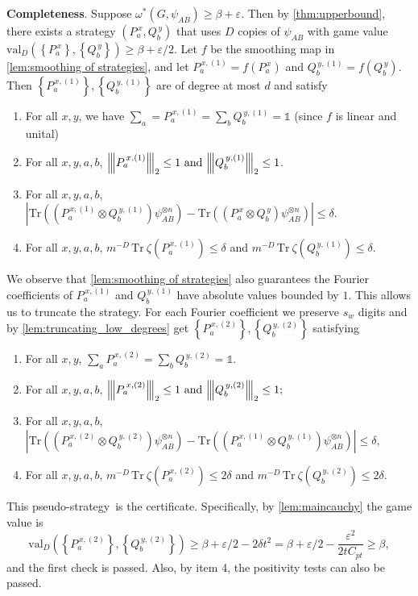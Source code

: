 \documentclass[10pt,a4paper]{article}
\theoremstyle{plain}
\theoremstyle{definition}
\newcommand {\set} [1] {\ensuremath{ \left\lbrace #1 \right\rbrace }}
\newcommand {\br} [1] {\ensuremath{ \left( #1 \right) }}
\newcommand {\ab} [1] {\ensuremath{ \left| #1 \right| }}
\newcommand{\nnorm}[1]{{\left\vert\kern-0.25ex\left\vert\kern-0.25ex\left\vert #1
		\right\vert\kern-0.25ex\right\vert\kern-0.25ex\right\vert}}
\newcommand {\Tr} {\ensuremath{ \mathrm{Tr} }}
\newcommand {\id} {\ensuremath{\mathds{1}}}
\newcommand{\gval}[3]{\ensuremath{\mathrm{val}_{#1}\br{\set{#2},\set{#3}}}}
\newcommand{\ep} {\ensuremath{\varepsilon}}
\newcommand{\dmcc} {\ensuremath{C_{pt}}}
\newcommand{\dlbo} {\ensuremath{{D}}}
\newcommand{\dldd} {\ensuremath{{d}}}
\newcommand{\wireal} {\ensuremath{{s_{w}}}}
\newcommand{\pseudostrategy} {pseudo-strategy}
\newcommand{\Pss} {\ensuremath{P^{\,x}_a}}
\newcommand{\Qss} {\ensuremath{Q^{\,y}_b}}
\newcommand{\Pnn}[1] {\ensuremath{{P^{\,x, (#1)}_a}}}
\newcommand{\Qnn}[1] {\ensuremath{{Q^{\,y, (#1)}_b}}}
\newcommand{\1}{\mathbb{1}} %
\begin{document}
\textbf{Completeness}.
Suppose $\omega^*(G, \psi_{AB}) \ge \beta+\ep$.
Then by \cref{thm:upperbound},
there exists a strategy $\br{\Pss, \Qss}$ that uses $\dlbo$ copies of $\psi_{AB}$ with game value $\gval{\dlbo}{\Pss}{\Qss}\ge \beta+\ep/2$.
Let $f$ be the smoothing map in \cref{lem:smoothing of strategies}, and
let $\Pnn{1}=f(\Pss)$ and $\Qnn{1}=f(\Qss)$.
Then $\set{\Pnn{1}}, \set{\Qnn{1}}$ are of degree at most $\dldd$ and satisfy
\begin{enumerate}
    \item  For all $x, y$, we have $\sum_{a}=\Pnn{1}=\sum_{b}\Qnn{1}=\id$ (since $f$ is linear and unital)
	  \item For all $x, y, a, b$, $\nnorm{\Pnn{1}}_2\leq1~\mbox{and}~\nnorm{\Qnn{1}}_2\leq1$.

	  \item For all $x, y, a, b$, $\ab{\Tr\br{\br{\Pnn{1}\otimes \Qnn{1}}\psi^{\otimes n}_{AB}}-\Tr\br{\br{\Pss\otimes \Qss}\psi^{\otimes n}_{AB}}}\leq\delta$.
		\item For all $x, y, a, b$, $m^{-\dlbo}\,\Tr~\zeta\br{\Pnn{1}}\leq\delta$ and $m^{-\dlbo}\,\Tr~\zeta\br{\Qnn{1}}\leq\delta$.
\end{enumerate}
We observe that \cref{lem:smoothing of strategies} also guarantees
the Fourier coefficients of $\Pnn{1}$ and $\Qnn{1}$ have absolute values
bounded by $1$.
This allows us to truncate the strategy.
For each Fourier coefficient we preserve $\wireal$ digits and by \cref{lem:truncating_low_degrees} get $\set{\Pnn{2}}, \set{\Qnn{2}}$ satisfying
\begin{enumerate}
    \item For all $x, y$, $\sum_{a}\Pnn{2}=\sum_{b}\Qnn{2}=\id$.
	  \item For all $x, y, a, b$, $\nnorm{\Pnn{2}}_2\leq1~\mbox{and}~\nnorm{\Qnn{2}}_2\leq1;$
	  \item For all $x, y, a, b$, $\ab{\Tr\br{\br{\Pnn{2}\otimes \Qnn{2}}\psi^{\otimes n}_{AB}}-\Tr\br{\br{\Pnn{1}\otimes \Qnn{1}}\psi^{\otimes n}_{AB}}}\leq\delta,$
		\item For all $x, y, a, b$, $m^{-\dlbo}\,\Tr~\zeta\br{\Pnn{2}}\leq2\delta$ and $m^{-\dlbo}\,\Tr~\zeta\br{\Qnn{2}}\leq2\delta. $
\end{enumerate}
This \pseudostrategy\ is the certificate.
Specifically, by \cref{lem:maincauchy} the game value is
$$\gval{\dlbo}{\Pnn{2}}{\Qnn{2}}\ge\beta+\ep/2-2\delta t^2 = \beta+\ep/2-\frac{\ep^2}{2t\dmcc}\ge\beta,$$
and the first check is passed.
Also, by item 4, the positivity tests can also be passed.
\end{document}
